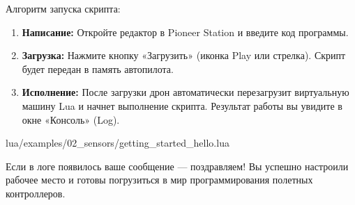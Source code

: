 Алгоритм запуска скрипта:
\begin{enumerate}
    \item \textbf{Написание:} Откройте редактор в Pioneer Station и введите код программы.
    \item \textbf{Загрузка:} Нажмите кнопку «Загрузить» (иконка Play или стрелка). Скрипт будет передан в память автопилота.
    \item \textbf{Исполнение:} После загрузки дрон автоматически перезагрузит виртуальную машину Lua и начнет выполнение скрипта. Результат работы вы увидите в окне «Консоль» (Log).
\end{enumerate}

\begin{codebox}
\begin{codefile}{lua/examples/02_sensors/getting_started_hello.lua}
\end{codefile}
\end{codebox}

Если в логе появилось ваше сообщение — поздравляем! Вы успешно настроили рабочее место и готовы погрузиться в мир программирования полетных контроллеров.
